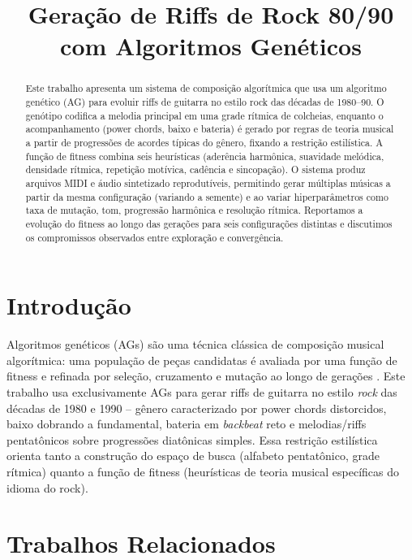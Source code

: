 \documentclass{article}
\title{Geração de Riffs de Rock 80/90 com Algoritmos Genéticos}
\begin{document}
\maketitle

\begin{abstract}
Este trabalho apresenta um sistema de composição algorítmica que usa um
algoritmo genético (AG) para evoluir riffs de guitarra no estilo rock das
décadas de 1980--90. O genótipo codifica a melodia principal em uma grade
rítmica de colcheias, enquanto o acompanhamento (power chords, baixo e
bateria) é gerado por regras de teoria musical a partir de progressões de
acordes típicas do gênero, fixando a restrição estilística. A função de
fitness combina seis heurísticas (aderência harmônica, suavidade melódica,
densidade rítmica, repetição motívica, cadência e sincopação). O sistema
produz arquivos MIDI e áudio sintetizado reprodutíveis, permitindo gerar
múltiplas músicas a partir da mesma configuração (variando a semente) e ao
variar hiperparâmetros como taxa de mutação, tom, progressão harmônica e
resolução rítmica. Reportamos a evolução do fitness ao longo das gerações
para seis configurações distintas e discutimos os compromissos observados
entre exploração e convergência.
\end{abstract}

\section{Introdução}\label{sec:introduction}

Algoritmos genéticos (AGs) são uma técnica clássica de composição musical
algorítmica: uma população de peças candidatas é avaliada por uma função de
fitness e refinada por seleção, cruzamento e mutação ao longo de gerações
\cite{HornerGoldberg1991}. Este trabalho usa exclusivamente AGs para gerar
riffs de guitarra no estilo \emph{rock} das décadas de 1980 e 1990 --
gênero caracterizado por power chords distorcidos, baixo dobrando a
fundamental, bateria em \emph{backbeat} reto e melodias/riffs pentatônicos
sobre progressões diatônicas simples. Essa restrição estilística orienta
tanto a construção do espaço de busca (alfabeto pentatônico, grade
rítmica) quanto a função de fitness (heurísticas de teoria musical
específicas do idioma do rock).

\section{Trabalhos Relacionados}\label{sec:related}
\end{document}

